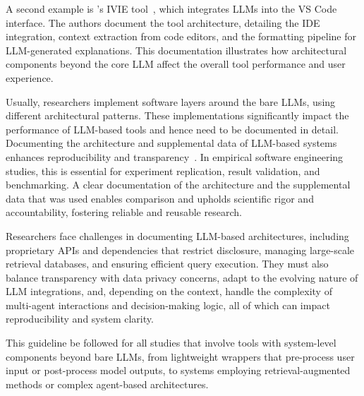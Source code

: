 A second example is \citeauthor{DBLP:conf/chi/YanHWH24}'s IVIE tool~\cite{DBLP:conf/chi/YanHWH24}, which integrates LLMs into the VS Code interface.
The authors document the tool architecture, detailing the IDE integration, context extraction from code editors, and the formatting pipeline for LLM-generated explanations.
This documentation illustrates how architectural components beyond the core LLM affect the overall tool performance and user experience.


Usually, researchers implement software layers around the bare LLMs, using different architectural patterns.
These implementations significantly impact the performance of LLM-based tools and hence need to be documented in detail.
Documenting the architecture and supplemental data of LLM-based systems enhances reproducibility and transparency~\cite{DBLP:journals/software/LuZXXW24}.
In empirical software engineering studies, this is essential for experiment replication, result validation, and benchmarking.
A clear documentation of the architecture and the supplemental data that was used enables comparison and upholds scientific rigor and accountability, fostering reliable and reusable research.


Researchers face challenges in documenting LLM-based architectures, including proprietary APIs and dependencies that restrict disclosure, managing large-scale retrieval databases, and ensuring efficient query execution.
They must also balance transparency with data privacy concerns, adapt to the evolving nature of LLM integrations, and, depending on the context, handle the complexity of multi-agent interactions and decision-making logic, all of which can impact reproducibility and system clarity.


This guideline \must be followed for all studies that involve tools with system-level components beyond bare LLMs, from lightweight wrappers that pre-process user input or post-process model outputs, to systems employing retrieval-augmented methods or complex agent-based architectures.
